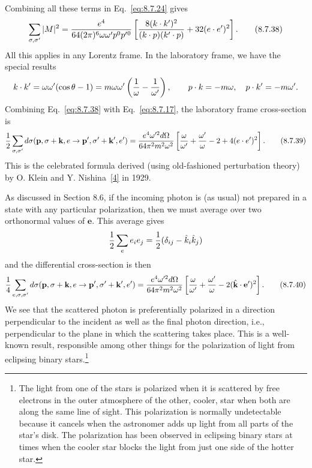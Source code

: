 Combining all these terms in Eq.~\eqref{eq:8.7.24} gives
\begin{equation}
\sum_{\sigma,\sigma'}|M|^2
={e^4\over64(2\pi)^6\omega\omega'p^0p'{}^0}
\left[{8(k\cdot k')^2\over(k\cdot p)(k'\cdot p)}+32(e\cdot e')^2\right].
\tag{8.7.38}\label{eq:8.7.38}
\end{equation}
All this applies in any Lorentz frame. In the laboratory frame, we have the
special results
\[
k\cdot k'=\omega\omega'(\cos\theta-1)
=m\omega\omega'\left({1\over\omega}-{1\over\omega'}\right),
\qquad p\cdot k=-m\omega,\quad p\cdot k'=-m\omega'.
\]
Combining Eq.~\eqref{eq:8.7.38} with Eq.~\eqref{eq:8.7.17}, the laboratory frame cross-section
is
\begin{align}
{1\over2}\sum_{\sigma,\sigma'}d\sigma(\mathbf p,\sigma+\mathbf k,e
\to\mathbf p',\sigma'+\mathbf k',e')
={e^4\omega'^2d\Omega\over64\pi^2m^2\omega^2}
\left[{\omega\over\omega'}+{\omega'\over\omega}-2+4(e\cdot e')^2\right].
\tag{8.7.39}\label{eq:8.7.39}
\end{align}
This is the celebrated formula derived (using old-fashioned perturbation
theory) by O. Klein and Y. Nishina~\hyperref[ref:8.4]{[4]} in 1929.

As discussed in Section 8.6, if the incoming photon is (as usual) not prepared
in a state with any particular polarization, then we must average over two
orthonormal values of $\mathbf e$. This average gives
\[
{1\over2}\sum_e e_i e_j={1\over2}(\delta_{ij}-\hat k_i\hat k_j)
\]
and the differential cross-section is then
\begin{equation}
{1\over4}\sum_{e,\sigma,\sigma'}d\sigma(\mathbf p,\sigma+\mathbf k,e
\to\mathbf p',\sigma'+\mathbf k',e')
={e^4\omega'^2d\Omega\over64\pi^2m^2\omega^2}
\left[{\omega\over\omega'}+{\omega'\over\omega}
-2(\hat{\mathbf k}\cdot\mathbf e')^2\right].
\tag{8.7.40}\label{eq:8.7.40}
\end{equation}
We see that the scattered photon is preferentially polarized in a direction
perpendicular to the incident as well as the final photon direction, i.e.,
perpendicular to the plane in which the scattering takes place. This is a
well-known result, responsible among other things for the polarization of
light from eclipsing binary stars.\footnote{The light from one of the stars
is polarized when it is scattered by free electrons in the outer atmosphere
of the other, cooler, star when both are along the same line of sight. This
polarization is normally undetectable because it cancels when the astronomer
adds up light from all parts of the star's disk. The polarization has been
observed in eclipsing binary stars at times when the cooler star blocks the
light from just one side of the hotter star.}

